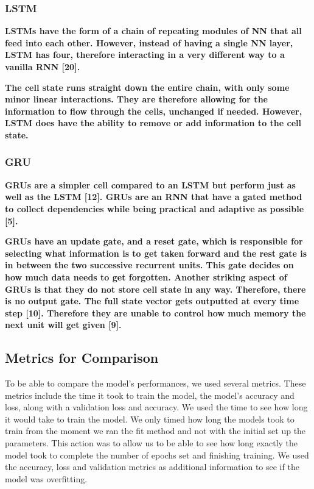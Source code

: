 \documentclass[a4paper,10pt]{article}
\begin{document}
	\subsubsection{LSTM}
	\textbf{LSTMs have the form of a chain of repeating modules of NN that all feed into each other. However, instead of having a single NN layer, LSTM has four, therefore interacting in a very different way to a vanilla RNN [20].}
	
	\textbf{The cell state runs straight down the entire chain, with only some minor linear interactions. They are therefore allowing for the information to flow through the cells, unchanged if needed. However, LSTM does have the ability to remove or add information to the cell state.}
		
	\subsubsection{GRU}
	\textbf{GRUs are a simpler cell compared to an LSTM but perform just as well as the LSTM [12]. GRUs are an RNN that have a gated method to collect dependencies while being practical and adaptive as possible [5].}
	
	\textbf{GRUs have an update gate, and a reset gate, which is responsible for selecting what information is to get taken forward and the rest gate is in between the two successive recurrent units. This gate decides on how much data needs to get forgotten. Another striking aspect of GRUs is that they do not store cell state in any way. Therefore, there is no output gate. The full state vector gets outputted at every time step [10]. Therefore they are unable to control how much memory the next unit will get given [9].}

\subsection{Metrics for Comparison}
	To be able to compare the model's performances, we used several metrics. These metrics include the time it took to train the model, the model's accuracy and loss, along with a validation loss and accuracy. We used the time to see how long it would take to train the model. We only timed how long the models took to train from the moment we ran the fit method and not with the initial set up the parameters. This action was to allow us to be able to see how long exactly the model took to complete the number of epochs set and finishing training. We used the accuracy, loss and validation metrics as additional information to see if the model was overfitting. 
\end{document}
